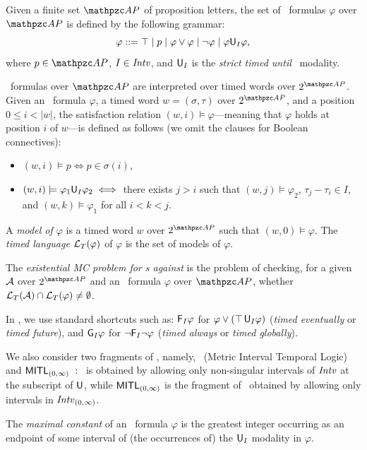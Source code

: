Given a finite set $\Prop$ of proposition letters, the set of \MTL\ formulas $\varphi$ over $\Prop$ is defined by the following grammar:
%
\[
\varphi::= \top \mid
p \mid
\varphi \vee \varphi \mid
\neg \varphi      \mid
\varphi \textsf{U}_I\varphi,
\]
%
where $p\in \Prop$, $I\in{\mathit{Intv}}$, and
$\textsf{U}_I$  is the \emph{strict timed until} \MTL\ modality. 

\MTL\ formulas over $\Prop$ are interpreted over  timed words over $2^{\Prop}$.
Given an \MTL\ formula $\varphi$, a  timed word $w=(\sigma,\tau)$ over $2^{\Prop}$, and a position $0\leq  i< |w|$, the satisfaction relation
$(w,i)\models\varphi$---meaning that $\varphi$ holds at position $i$ of $w$---is  defined as follows (we omit the clauses for Boolean connectives):
\begin{itemize}
\item $(w,i)\models p \iff p\in\sigma(i)$,
\item $(w,i)\models \varphi_1 \textsf{U}_I\varphi_2
              \iff $ there exists $j>i$ such that $(w,j)\models \varphi_2$, $\tau_j-\tau_i\in I$, and $(w,k)\models \varphi_1$ for all $i<k<j$.
\end{itemize}
%
A \emph{model of $\varphi$} is a  timed word $w$ over $2^{\Prop}$ such that $(w,0)\models \varphi$. The \emph{timed language} ${\mathcal{L}_T}(\varphi)$ of $\varphi$ is the set of  models of $\varphi$.

The \emph{existential MC problem for \TA s against \MTL} is the problem of checking, for a given \TA\ $\mathcal{A}$ over $2^{\Prop}$ and an \MTL\ formula $\varphi$ over $\Prop$, whether
${\mathcal{L}_T}(\mathcal{A})\cap {\mathcal{L}_T}(\varphi)\neq \emptyset$.

In \MTL, we use standard shortcuts such as: $\textsf{F}_I \varphi$ for $\varphi \vee (\operatorname{\top} 
\textsf{U}_I \varphi)$ (\emph{timed eventually} or \emph{timed future}), and $\textsf{G}_I \varphi$ for $\neg \textsf{F}_I  \neg\varphi$ (\emph{timed always} or \emph{timed globally}).
 
 We also consider two fragments of \MTL, namely, \MITL\ (Metric Interval Temporal Logic)
and $\text{\sffamily MITL}_{(0,\infty)}$~\cite{Alur:1996}: \MITL\ is obtained by allowing only non-singular intervals of ${\mathit{Intv}}$ at the subscript of $\textsf{U}$, while $\text{\sffamily MITL}_{(0,\infty)}$ is the fragment of \MITL\ obtained by allowing only intervals
in ${\mathit{Intv}_{(0,\infty)}}$. 

The \emph{maximal constant} of an \MTL\ formula $\varphi$ is the greatest integer occurring as an endpoint of some interval of (the occurrences of) the $\textsf{U}_I$ modality in $\varphi$.

